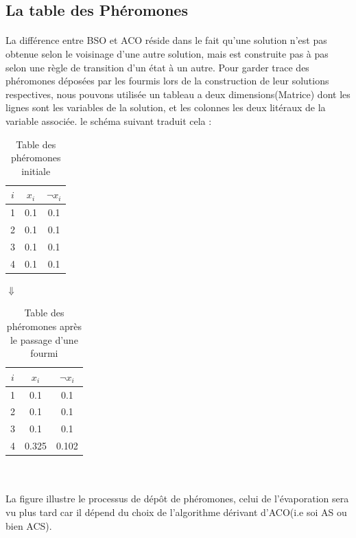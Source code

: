 	
	\subsection{La table des Phéromones}
	\paragraph{}
	La différence entre BSO et ACO réside dans le fait qu'une solution n'est pas obtenue selon le voisinage d'une autre solution, mais est construite pas à pas selon une règle de transition d'un état à un autre. Pour garder trace des phéromones déposées par les fourmis lors de la construction de leur solutions respectives, nous pouvons utilisée un tableau a deux dimensions(Matrice) dont les lignes sont les variables de la solution, et les colonnes les deux litéraux de la variable associée. le schéma suivant traduit cela : 
	
	\begin{minipage}{\textwidth}
		\centering
		\begin{table}[H]
			\centering
			\begin{tabular}{|c|c|c|}
				\hline
				$i$ & $x_{i}$ & $\lnot x_{i}$ \\ \hline
				1   & 0.1     & 0.1           \\ \hline
				2   & 0.1     & 0.1           \\ \hline
				3   & 0.1     & 0.1           \\ \hline
				4   & 0.1     & 0.1           \\ \hline
			\end{tabular}
			\caption{Table des phéromones initiale}
		\end{table}
		$\Downarrow$
		\begin{table}[H]
			\centering
			\begin{tabular}{|c|c|c|}
				\hline
				$i$ & $x_{i}$ & $\lnot x_{i}$ \\ \hline
				1   & 0.1     & 0.1           \\ \hline
				2   & 0.1     & 0.1           \\ \hline
				3   & 0.1     & 0.1           \\ \hline
				4   & \cellcolor{green}0.325     & \cellcolor{red!60}0.102           \\ \hline
			\end{tabular}
			\caption{Table des phéromones après le passage d'une fourmi}
		\end{table}
	\end{minipage}
	\\~\\
	La figure illustre le processus de dépôt de phéromones, celui de l'évaporation sera vu plus tard car il dépend du choix de l'algorithme dérivant d'ACO(i.e soi AS ou bien ACS).
